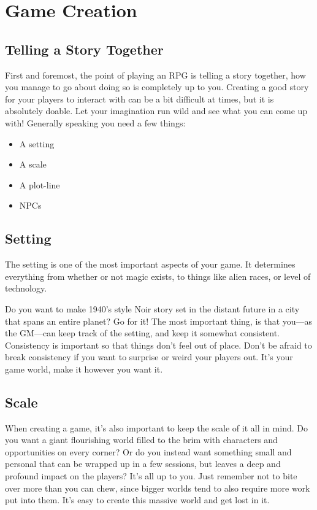 \chapter{Game Creation}
\section{Telling a Story Together}
First and foremost, the point of playing an RPG is telling a story together, how you manage to go about doing so is completely up to you.
Creating a good story for your players to interact with can be a bit difficult at times, but it is absolutely doable.
Let your imagination run wild and see what you can come up with!
Generally speaking you need a few things:
\begin{itemize}
    \item A setting
    \item A scale
    \item A plot-line
    \item NPCs
\end{itemize}

\section{Setting}
The setting is one of the most important aspects of your game.
It determines everything from whether or not magic exists, to things like alien races, or level of technology.

Do you want to make 1940's style Noir story set in the distant future in a city that spans an entire planet? Go for it!
The most important thing, is that you---as the GM---can keep track of the setting, and keep it somewhat consistent.
Consistency is important so that things don't feel out of place. 
Don't be afraid to break consistency if you want to surprise or weird your players out.
It's your game world, make it however you want it.

\section{Scale}
When creating a game, it's also important to keep the scale of it all in mind.
Do you want a giant flourishing world filled to the brim with characters and opportunities on every corner? 
Or do you instead want something small and personal that can be wrapped up in a few sessions, but leaves a deep and profound impact on the players?
It's all up to you.
Just remember not to bite over more than you can chew, since bigger worlds tend to also require more work put into them.
It's easy to create this massive world and get lost in it.


